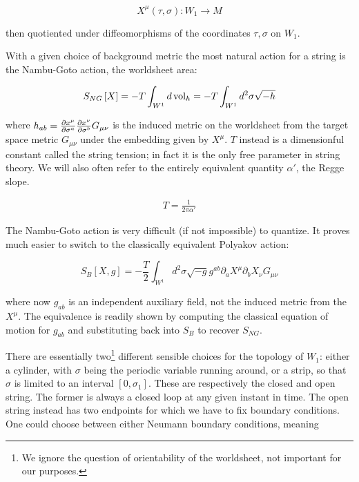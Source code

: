 \begin{equation}
	X^{\mu} (\tau,\sigma) : W_1 \rightarrow M
	\label{}
\end{equation}

then quotiented under diffeomorphisms of the coordinates $\tau,\sigma$ on $W_1$.

With a given choice of background metric the most natural action for a string is the Nambu-Goto action, the worldsheet area:

\begin{equation}
	S_{NG}\left[ X \right] = - T \int_{W^1} d\operatorname{vol}_h = - T \int_{W^1} d^2 \sigma \sqrt{-h}
	\label{}
\end{equation}

where $h_{ab} = \frac{\partial x^\mu}{\partial\sigma^a} \frac{\partial x^\nu}{\partial\sigma^b} G_{\mu\nu}$ is the induced metric on the worldsheet from the target space metric $G_{\mu\nu}$ under the embedding given by $X^\mu$. $T$ instead is a dimensionful constant called the string tension; in fact it is the only free parameter in string theory. We will also often refer to the entirely equivalent quantity $\alpha'$, the Regge slope. 

\begin{align}
	T = \frac{1}{2\pi\alpha'}
	\label{}
\end{align}

The Nambu-Goto action is very difficult (if not impossible) to quantize. It proves much easier to switch to the classically equivalent Polyakov action: 

\begin{equation}
	S_B\left[ X,g \right] = -\frac{T}{2} \int_{W^1} d^2\sigma \sqrt{-g} g^{ab} \partial_a X^\mu \partial_b X_\nu G_{\mu\nu}
\end{equation}


where now $g_{ab}$ is an independent auxiliary field, not the induced metric from the $X^\mu$. The equivalence is readily shown by computing the classical equation of motion for $g_{ab}$ and substituting back into $S_B$ to recover $S_{NG}$.


There are essentially two\footnote{We ignore the question of orientability of the worldsheet, not important for our purposes.} different sensible choices for the topology of $W_1$: either a cylinder, with $\sigma$ being the periodic variable running around, or a strip, so that $\sigma$ is limited to an interval $[0,\sigma_1]$. These are respectively the closed and open string. The former is always a closed loop at any given instant in time. The open string instead has two endpoints for which we have to fix boundary conditions.  One could choose between either Neumann boundary conditions, meaning

